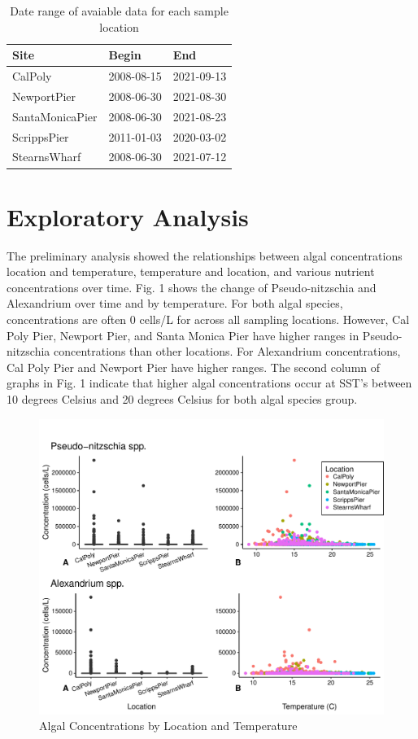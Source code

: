 \documentclass[
  12pt,
]{article}
\begin{document}
\begin{longtable}[t]{lll}
\caption{\label{tab:prelim data analysis}Date range of avaiable data for each sample location}\\
\toprule
Site & Begin & End\\
\midrule
CalPoly & 2008-08-15 & 2021-09-13\\
NewportPier & 2008-06-30 & 2021-08-30\\
SantaMonicaPier & 2008-06-30 & 2021-08-23\\
ScrippsPier & 2011-01-03 & 2020-03-02\\
StearnsWharf & 2008-06-30 & 2021-07-12\\
\bottomrule
\end{longtable}

\newpage

\hypertarget{exploratory-analysis}{%
\section{Exploratory Analysis}\label{exploratory-analysis}}

The preliminary analysis showed the relationships between algal
concentrations location and temperature, temperature and location, and
various nutrient concentrations over time. Fig. 1 shows the change of
Pseudo-nitzschia and Alexandrium over time and by temperature. For both
algal species, concentrations are often 0 cells/L for across all
sampling locations. However, Cal Poly Pier, Newport Pier, and Santa
Monica Pier have higher ranges in Pseudo-nitzschia concentrations than
other locations. For Alexandrium concentrations, Cal Poly Pier and
Newport Pier have higher ranges. The second column of graphs in Fig. 1
indicate that higher algal concentrations occur at SST's between 10
degrees Celsius and 20 degrees Celsius for both algal species group.

\begin{figure}
\centering
\includegraphics{Habs_Final_Report_files/figure-latex/Exploratory Analysis-1.pdf}
\caption{Algal Concentrations by Location and Temperature}
\end{figure}
\end{document}

